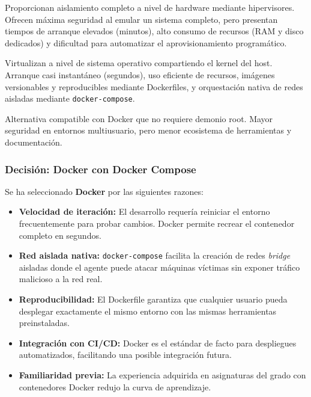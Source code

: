 \begin{description}[style=nextline, leftmargin=1cm, font=\bfseries]
    \item[Máquinas Virtuales (VMware, VirtualBox)]
    Proporcionan aislamiento completo a nivel de hardware mediante hipervisores. Ofrecen máxima seguridad al emular un sistema completo, pero presentan tiempos de arranque elevados (minutos), alto consumo de recursos (RAM y disco dedicados) y dificultad para automatizar el aprovisionamiento programático.
    
    \item[Contenedores Docker]
    Virtualizan a nivel de sistema operativo compartiendo el kernel del host. Arranque casi instantáneo (segundos), uso eficiente de recursos, imágenes versionables y reproducibles mediante Dockerfiles, y orquestación nativa de redes aisladas mediante \texttt{docker-compose}.
    
    \item[Contenedores Podman]
    Alternativa compatible con Docker que no requiere demonio root. Mayor seguridad en entornos multiusuario, pero menor ecosistema de herramientas y documentación.
\end{description}

\subsubsection{Decisión: Docker con Docker Compose}

Se ha seleccionado \textbf{Docker} por las siguientes razones:

\begin{itemize}
    \item \textbf{Velocidad de iteración:} El desarrollo requería reiniciar el entorno frecuentemente para probar cambios. Docker permite recrear el contenedor completo en segundos.
    \item \textbf{Red aislada nativa:} \texttt{docker-compose} facilita la creación de redes \textit{bridge} aisladas donde el agente puede atacar máquinas víctimas sin exponer tráfico malicioso a la red real.
    \item \textbf{Reproducibilidad:} El Dockerfile garantiza que cualquier usuario pueda desplegar exactamente el mismo entorno con las mismas herramientas preinstaladas.
    \item \textbf{Integración con CI/CD:} Docker es el estándar de facto para despliegues automatizados, facilitando una posible integración futura.
    \item \textbf{Familiaridad previa:} La experiencia adquirida en asignaturas del grado con contenedores Docker redujo la curva de aprendizaje.
\end{itemize}

